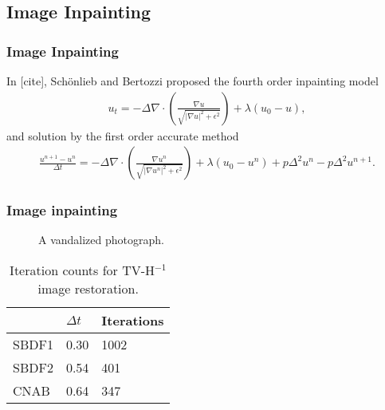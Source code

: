 \documentclass[hyperref={pdfpagelabels=false}]{beamer}
\begin{document}
\subsection{Image Inpainting} 
\begin{frame}
	\frametitle{Image Inpainting} 
	In [cite], Sch\"{o}nlieb and Bertozzi proposed the fourth order inpainting model 
	\begin{align*}
	u_t = -\Delta \nabla \cdot\left( \frac{\nabla u}{\sqrt{\left\vert \nabla u \right\vert^2 + \epsilon^2}} \right) + \lambda (u_0 - u),
	\end{align*}
	and solution by the first order accurate method 
	\begin{align*}
	\frac{u^{n+1} - u^n}{\Delta t} 
	=  -\Delta \nabla \cdot\left( \frac{\nabla u^n}{\sqrt{\left\vert \nabla u^n \right\vert^2 + \epsilon^2}} \right) + \lambda (u_0 - u^n) 
	+ p\Delta^2 u^n 
	- p\Delta^2 u^{n+1}.
	\end{align*}
\end{frame}
\begin{frame}
	\frametitle{Image inpainting} 
	\begin{figure}
		\centering
\caption{A vandalized photograph.} 
	\end{figure}
	
	\begin{table}[b]
		\centering 
	\caption{Iteration counts for TV-H$^{-1}$ image restoration.}
		\begin{tabular}{lll}
			\toprule 
			& $\Delta t$ & Iterations 
			\\ \midrule 
		SBDF1 & 0.30 & 1002 
		\\ 
		SBDF2 & 0.54 & 401 
		\\ 
		CNAB & 0.64 & 347
		\\ \bottomrule
		\end{tabular}
	\end{table} 
\end{frame}
\end{document}
